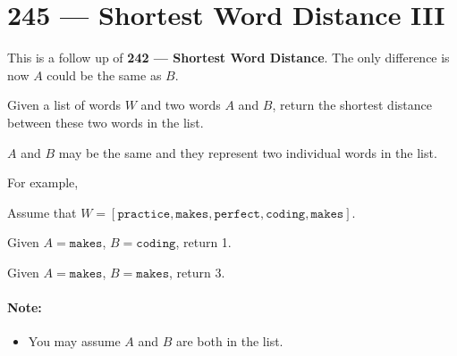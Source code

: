 \section{245 --- Shortest Word Distance III}
This is a follow up of \textbf{242 --- Shortest Word Distance}. The only difference is now $A$ could be the same as $B$.
\par
Given a list of words $W$ and two words $A$ and $B$, return the shortest distance between these two words in the list.
\par
$A$ and $B$ may be the same and they represent two individual words in the list.
\par
For example,
\par
Assume that $W = [\texttt{practice}, \texttt{makes}, \texttt{perfect}, \texttt{coding}, \texttt{makes}]$.
\par
Given $A = \texttt{makes}$, $B = \texttt{coding}$, return 1.
\par
Given $A = \texttt{makes}$, $B = \texttt{makes}$, return 3.
\paragraph{Note:}
\begin{itemize}
\item You may assume $A$ and $B$ are both in the list.
\end{itemize}